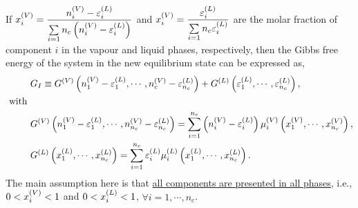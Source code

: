 If $\mfr[x]{i}{V}=\frc{\mfr[n]{i}{V}-\mfr[\varepsilon]{i}{L}}{\summation_{i=1}{n_{c}}\left(\mfr[n]{i}{V}-\mfr[\varepsilon]{i}{L}\right)}$ and $\mfr[x]{i}{V}=\frc{\mfr[\varepsilon]{i}{L}}{\summation_{i=1}{n_{c}}\mfr[\varepsilon]{i}{L}}$ are the molar fraction of component $i$ in the vapour and liquid phases, respectively, then the Gibbs free energy of the system in the new equilibrium state can be expressed as,
\begin{subequations}
  \begin{align}
   &G_{I} \equiv \mfr[G]{}{V}\left(\mfr[n]{1}{V}-\mfr[\varepsilon]{1}{L}, \cdots, \mfr[n]{c}{V}-\mfr[\varepsilon]{n_{c}}{L}\right) + \mfr[G]{}{L}\left(\mfr[\varepsilon]{1}{L}, \cdots, \mfr[\varepsilon]{n_{c}}{L}\right), \\
\text{ with }& \nonumber\\
        &\mfr[G]{}{V}\left(\mfr[n]{1}{V}-\mfr[\varepsilon]{1}{L}, \cdots, \mfr[n]{n_{c}}{V}-\mfr[\varepsilon]{n_{c}}{L}\right) = \summation_{i=1}^{n_{c}}\left(\mfr[n]{i}{V}-\mfr[\varepsilon]{i}{L}\right) \mfr[\mu]{i}{V}\left(\mfr[x]{1}{V}, \cdots, \mfr[x]{n_{c}}{V}\right), \\
   &\mfr[G]{}{L}\left(\mfr[x]{1}{L}, \cdots, \mfr[x]{n_{c}}{L}\right) = \summation_{i=1}^{n_{c}}\mfr[\varepsilon]{i}{L}\mfr[\mu]{i}{L}\left(\mfr[x]{1}{L}, \cdots, \mfr[x]{n_{c}}{L}\right).\label{Chapter:ThermodynamicFormulation:Eqn:Stability_DG0}
  \end{align}
\end{subequations}
The main assumption here is that \underline{all components are presented in all phases}, i.e., $0<\mfr[x]{i}{V}<1$ and $0<\mfr[x]{i}{L}<1$, $\forall i=1, \cdots, n_{c}$. 

